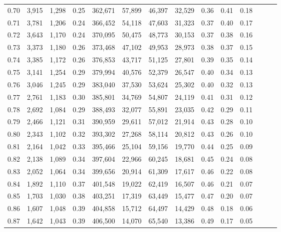 \begin{tabular}{rrrrrrrrrrrrrr}
0.70 &   3,915 &  1,298 &  0.25 &  362,671 &   57,899 &  46,397 &  32,529 &  0.36 &  0.41 &      0.18 \\
0.71 &   3,781 &  1,206 &  0.24 &  366,452 &   54,118 &  47,603 &  31,323 &  0.37 &  0.40 &      0.17 \\
0.72 &   3,643 &  1,170 &  0.24 &  370,095 &   50,475 &  48,773 &  30,153 &  0.37 &  0.38 &      0.16 \\
0.73 &   3,373 &  1,180 &  0.26 &  373,468 &   47,102 &  49,953 &  28,973 &  0.38 &  0.37 &      0.15 \\
0.74 &   3,385 &  1,172 &  0.26 &  376,853 &   43,717 &  51,125 &  27,801 &  0.39 &  0.35 &      0.14 \\
0.75 &   3,141 &  1,254 &  0.29 &  379,994 &   40,576 &  52,379 &  26,547 &  0.40 &  0.34 &      0.13 \\
0.76 &   3,046 &  1,245 &  0.29 &  383,040 &   37,530 &  53,624 &  25,302 &  0.40 &  0.32 &      0.13 \\
0.77 &   2,761 &  1,183 &  0.30 &  385,801 &   34,769 &  54,807 &  24,119 &  0.41 &  0.31 &      0.12 \\
0.78 &   2,692 &  1,084 &  0.29 &  388,493 &   32,077 &  55,891 &  23,035 &  0.42 &  0.29 &      0.11 \\
0.79 &   2,466 &  1,121 &  0.31 &  390,959 &   29,611 &  57,012 &  21,914 &  0.43 &  0.28 &      0.10 \\
0.80 &   2,343 &  1,102 &  0.32 &  393,302 &   27,268 &  58,114 &  20,812 &  0.43 &  0.26 &      0.10 \\
0.81 &   2,164 &  1,042 &  0.33 &  395,466 &   25,104 &  59,156 &  19,770 &  0.44 &  0.25 &      0.09 \\
0.82 &   2,138 &  1,089 &  0.34 &  397,604 &   22,966 &  60,245 &  18,681 &  0.45 &  0.24 &      0.08 \\
0.83 &   2,052 &  1,064 &  0.34 &  399,656 &   20,914 &  61,309 &  17,617 &  0.46 &  0.22 &      0.08 \\
0.84 &   1,892 &  1,110 &  0.37 &  401,548 &   19,022 &  62,419 &  16,507 &  0.46 &  0.21 &      0.07 \\
0.85 &   1,703 &  1,030 &  0.38 &  403,251 &   17,319 &  63,449 &  15,477 &  0.47 &  0.20 &      0.07 \\
0.86 &   1,607 &  1,048 &  0.39 &  404,858 &   15,712 &  64,497 &  14,429 &  0.48 &  0.18 &      0.06 \\
0.87 &   1,642 &  1,043 &  0.39 &  406,500 &   14,070 &  65,540 &  13,386 &  0.49 &  0.17 &      0.05 \\

\end{tabular}
